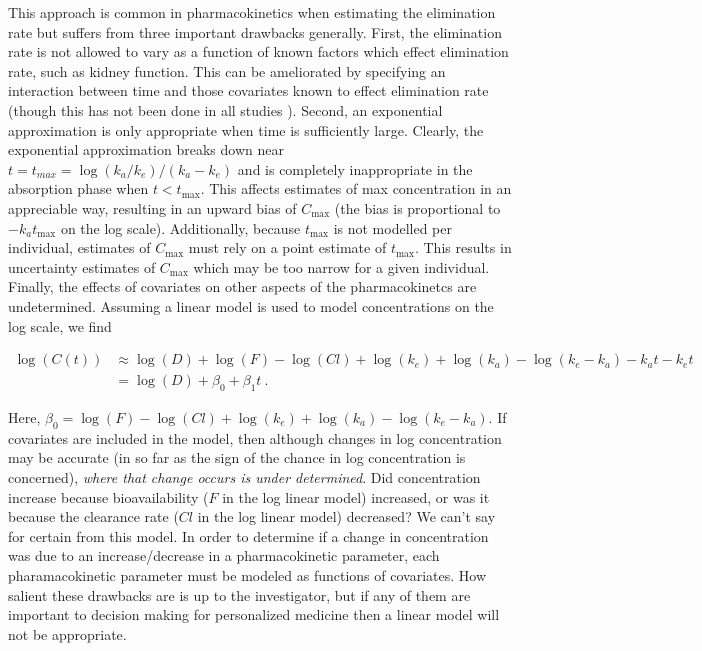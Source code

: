 This approach is common in pharmacokinetics when estimating the elimination rate but suffers from three important drawbacks generally. First, the elimination rate is not allowed to vary as a function of known factors which effect elimination rate, such as kidney function.  This can be ameliorated by specifying an interaction between time and those covariates known to effect elimination rate (though this has not been done in all studies \cite{gulilat2020drug}).  Second, an exponential approximation is only appropriate when time is sufficiently large.  Clearly, the exponential approximation breaks down near $t=t_{max} = \log(k_a/k_e)/(k_a-k_e)$ and is completely inappropriate in the absorption phase when $t<t_{\max}$.  This affects estimates of max concentration in an appreciable way, resulting in an upward bias of $C_{\max}$ (the bias is proportional to $-k_a t_{\max}$ on the log scale).  Additionally, because $t_{\max}$ is not modelled per individual, estimates of $C_{\max}$ must rely on a point estimate of $t_{\max}$.  This results in uncertainty estimates of $C_{\max}$ which may be too narrow for a given individual.  Finally, the effects of covariates on other aspects of the pharmacokinetcs are undetermined. Assuming a linear model is used to model concentrations on the log scale, we find

\begin{align}
	\log(C(t)) & \approx \log(D) + \log(F) - \log(Cl) + \log(k_e) + \log(k_a) - \log(k_e-k_a) - k_at - k_et \nonumber \\
	                 & = \log(D) + \beta_0 + \beta_1t \>. \nonumber
\end{align}


\noindent Here, $\beta_0 =  \log(F) - \log(Cl) + \log(k_e) + \log(k_a) - \log(k_e-k_a)$.  If covariates are included in the model, then although changes in log concentration may be accurate (in so far as the sign of the chance in log concentration is concerned), \textit{where that change occurs is under determined}.  Did concentration increase because bioavailability ($F$ in the log linear model) increased, or was it because the clearance rate ($Cl$ in the log linear model) decreased?  We can't say for certain from this model. In order to determine if a change in concentration was due to an increase/decrease in a pharmacokinetic parameter, each pharamacokinetic parameter must be modeled as functions of covariates. How salient these drawbacks are is up to the investigator, but if any of them are important to decision making for personalized medicine then a linear model will not be appropriate.

